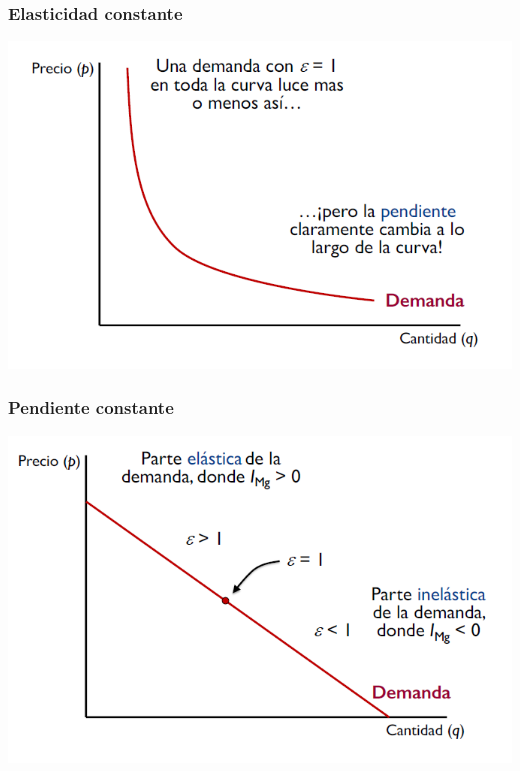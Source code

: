 \documentclass{beamer}
\begin{document}
\begin{frame}
    \frametitle{Elasticidad constante}
    \includegraphics[scale=0.6]{../Figures/Tema_06.45_elasticidad.png}
\end{frame}

\begin{frame}
  \frametitle{Pendiente constante}
  \includegraphics[scale=0.6]{../Figures/Tema_06.46_elasticidad2.png}
\end{frame}
\end{document}
